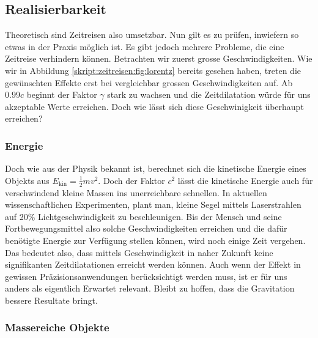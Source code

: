 \begin{refsection}
	\section{Realisierbarkeit}
    
    Theoretisch sind Zeitreisen also umsetzbar. Nun gilt es zu prüfen, inwiefern so etwas in der Praxis möglich ist. Es gibt jedoch mehrere Probleme, die eine Zeitreise verhindern können.
    Betrachten wir zuerst grosse Geschwindigkeiten. Wie wir in Abbildung \ref{skript:zeitreisen:fig:lorentz} bereits gesehen haben, treten die gewünschten Effekte erst bei vergleichbar grossen Geschwindigkeiten auf. Ab $0.99c$ beginnt der Faktor $\gamma$ stark zu wachsen und die Zeitdilatation würde für uns akzeptable Werte erreichen.
    Doch wie lässt sich diese Geschwinigkeit überhaupt erreichen?
    
    \subsubsection{Energie}\label{skript:chapters:zrirtreisen:energie}
    
    Doch wie aus der Physik bekannt ist, berechnet sich die kinetische Energie eines Objekts aus $E_{\text{kin}}=\frac{1}{2}mv^2$. Doch der Faktor $c^2$ lässt die kinetische Energie auch für verschwindend kleine Massen ins unerreichbare schnellen.
    In aktuellen wissenschaftlichen Experimenten, plant man, kleine Segel mittels Laserstrahlen auf 20\% Lichtgeschwindigkeit zu beschleunigen. Bis der Mensch und seine Fortbewegungsmittel also solche Geschwindigkeiten erreichen und die dafür benötigte Energie zur Verfügung stellen können, wird noch einige Zeit vergehen.
    Das bedeutet also, dass mittels Geschwindigkeit in naher Zukunft keine signifikanten Zeitdilatationen erreicht werden können. Auch wenn der Effekt in gewissen Präzisionsanwendungen berücksichtigt werden muss, ist er für uns anders als eigentlich Erwartet relevant. Bleibt zu hoffen, dass die Gravitation bessere Resultate bringt. 
    
    \subsubsection{Massereiche Objekte}
    

\end{refsection}
